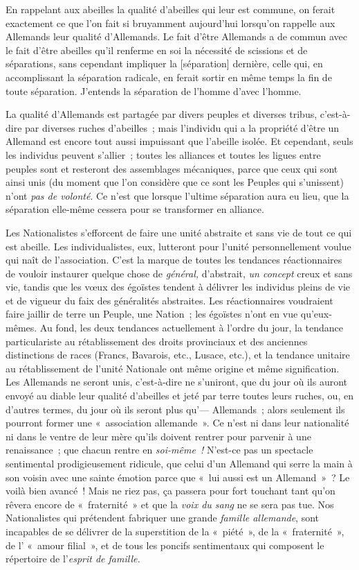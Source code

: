 \documentclass[french,twoside]{book} %
\newcommand\corr[1]{#1}
\begin{document}
En rappelant aux abeilles la qualité d’abeilles qui leur est commune, on ferait exactement ce que l’on fait si bruyamment aujourd’hui lorsqu’on rappelle aux Allemands leur qualité d’Allemands. Le fait d’être Allemands a de commun avec le fait d’être abeilles qu’il renferme en soi la nécessité de scissions et de séparations, sans cependant impliquer la [{\corr séparation}] dernière, celle qui, en accomplissant la séparation radicale, en ferait sortir en même temps la fin de toute séparation. J’entends la séparation de l’homme d’avec l’homme.\par
La qualité d’Allemands est partagée par divers peuples et diverses tribus, c’est-à-dire par diverses ruches d’abeilles ; mais l’individu qui a la propriété d’être un Allemand est encore tout aussi impuissant que l’abeille isolée. Et cependant, seuls les individus peuvent s’allier ; toutes les alliances et toutes les ligues entre peuples sont et resteront des assemblages mécaniques, parce que ceux qui sont ainsi unis (du moment que l’on considère que ce sont les Peuples qui s’unissent) n’ont \emph{pas de volonté}. Ce n’est que lorsque l’ultime séparation aura eu lieu, que la séparation elle-même cessera pour se transformer en alliance.\par
Les Nationalistes s’efforcent de faire une unité abstraite et sans vie de tout ce qui est abeille. Les individualistes, eux, lutteront pour l’unité personnellement voulue qui naît de l’association. C’est la marque de toutes les tendances réactionnaires de vouloir instaurer quelque chose de \emph{général,} d’abstrait, \emph{un concept} creux et sans vie, tandis que les vœux des égoïstes tendent à délivrer les individus pleins de vie et de vigueur du faix des généralités abstraites. Les réactionnaires voudraient faire jaillir de terre un Peuple, une Nation ; les égoïstes n’ont en vue qu’eux-mêmes. Au fond, les deux tendances actuellement à l’ordre du jour, la tendance particulariste au rétablissement des droits provinciaux et des anciennes distinctions de races (Francs, Bavarois,  etc., Lusace, etc.), et la tendance unitaire au rétablissement de l’unité Nationale ont même origine et même signification. Les Allemands ne seront unis, c’est-à-dire ne s’uniront, que du jour où ils auront envoyé au diable leur qualité d’abeilles et jeté par terre toutes leurs ruches, ou, en d’autres termes, du jour où ils seront plus qu’— Allemands ; alors seulement ils pourront former une « association allemande ». Ce n’est ni dans leur nationalité ni dans le ventre de leur mère qu’ils doivent rentrer pour parvenir à une renaissance ; que chacun rentre en \emph{soi-même ! }N’est-ce pas un spectacle sentimental prodigieusement ridicule, que celui d’un Allemand qui serre la main à son voisin avec une sainte émotion parce que « lui aussi est un Allemand » ? Le voilà bien avancé ! Mais ne riez pas, ça passera pour fort touchant tant qu’on rêvera encore de « fraternité » et que la \emph{voix du sang }ne se sera pas tue. Nos Nationalistes qui prétendent fabriquer une grande \emph{famille allemande}, sont incapables de se délivrer de la superstition de la « piété », de la « fraternité », de l’ « amour filial », et de tous les poncifs sentimentaux qui composent le répertoire de l’\emph{esprit de famille.}\par
\end{document}

